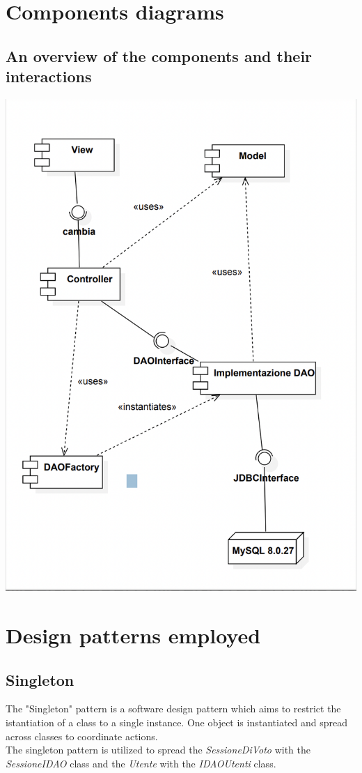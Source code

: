 \documentclass[11pt, oneside]{article}   	%
\begin{document}
    
\section{Components diagrams}
\subsection{An overview of the components and their interactions}
\begin{center}
\includegraphics[scale=0.8]{images/componentDiagram.png}
\end{center}


\section{Design patterns employed}
\subsection{Singleton}
The "Singleton" pattern is a software design pattern which aims to restrict the istantiation of a class to a single instance. One object is instantiated and spread across classes to coordinate actions.\\
The singleton pattern is utilized to spread the \emph{SessioneDiVoto} with the \emph{SessioneIDAO} class and the \emph{Utente} with the \emph{IDAOUtenti} class.
\end{document}
